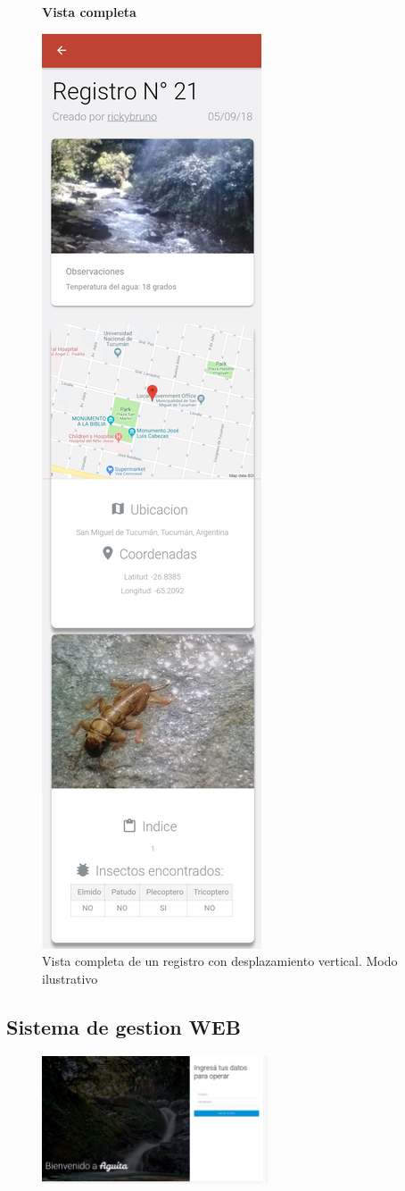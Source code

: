 				\begin{figure}
					\centering
					\textbf{Vista completa}\par\medskip
						\includegraphics[height=1.2\textwidth]{Screenshots/verRegistroCompleto.png}
						\caption{Vista completa de un registro con desplazamiento vertical. Modo ilustrativo}
				\end{figure}

			\subsection{Sistema de gestion WEB}
				\begin{figure}
					\centering
						\includegraphics[width=0.6\textwidth]{Screenshots/web/login.png}

				\end{figure}

